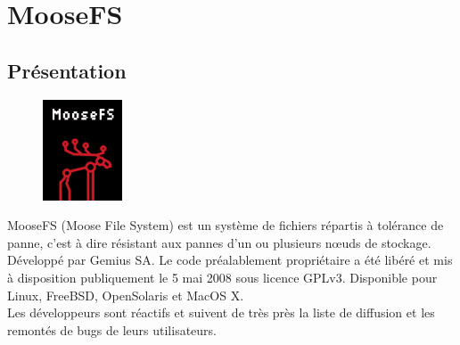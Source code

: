 \documentclass[12pt]{report}
\begin{document}
	\chapter{MooseFS}
		\section{Présentation}

			\begin{figure}[H]
				\begin{center}
					\includegraphics[width=0.15\linewidth]{images/moosefs.png}
				\end{center}
			\end{figure}
	
				
			MooseFS (Moose File System) est un système de fichiers répartis à tolérance de panne,
			c’est à dire résistant aux pannes d’un ou plusieurs nœuds de stockage.
			Développé par Gemius SA. Le code préalablement propriétaire a été libéré et mis à disposition publiquement le 5 mai 2008
			sous licence GPLv3. Disponible pour Linux, FreeBSD, OpenSolaris et MacOS X.\\
			Les développeurs sont réactifs et suivent de très près la liste de diffusion et les remontés de bugs de leurs utilisateurs.
\end{document}
